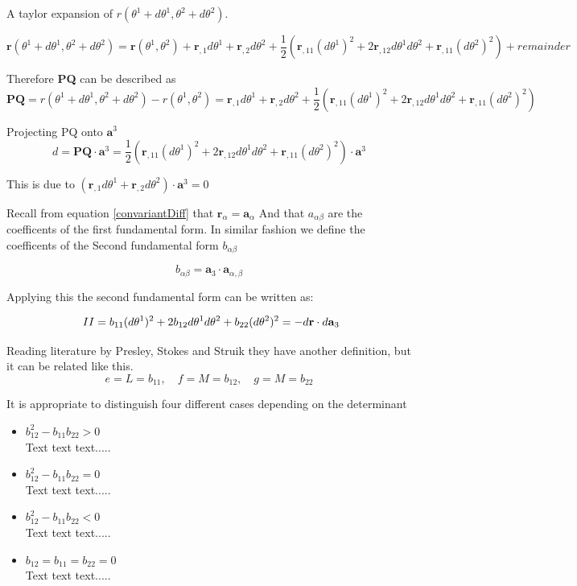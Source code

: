 A taylor expansion of $r(\theta^1 + d\theta^1, \theta^2 + d\theta^2)$.

$$
\textbf{r}(\theta^1 + d\theta^1, \theta^2 + d\theta^2)= \textbf{r}(\theta^1, \theta^2) + \textbf{r}_{,1} d\theta^1 + \textbf{r}_{,2} d\theta^2 + \frac{1}{2}(\textbf{r}_{,11}(d\theta^1)^2 + 2\textbf{r}_{,12}d\theta^1 d\theta^2 + \textbf{r}_{,11}(d\theta^2)^2) + remainder
$$

Therefore \textbf{PQ} can be described as
$$
\textbf{PQ} = r(\theta^1 + d\theta^1, \theta^2 + d\theta^2) - r(\theta^1, \theta^2) =  \textbf{r}_{,1} d\theta^1 + \textbf{r}_{,2} d\theta^2 + \frac{1}{2}(\textbf{r}_{,11}(d\theta^1)^2 + 2\textbf{r}_{,12}d\theta^1 d\theta^2 + \textbf{r}_{,11}(d\theta^2)^2) 
$$

Projecting PQ onto $\textbf{a}^3$ 
$$
d = \textbf{PQ}\cdot\textbf{a}^3 = \frac{1}{2}(\textbf{r}_{,11}(d\theta^1)^2 + 2\textbf{r}_{,12}d\theta^1 d\theta^2 + \textbf{r}_{,11}(d\theta^2)^2) \cdot \textbf{a}^3 
$$

This is due to $(\textbf{r}_{,1} d\theta^1 + \textbf{r}_{,2}d\theta^2)\cdot\textbf{a}^3 = 0$

Recall from equation \ref{convariantDiff} that $\textbf{r}_\alpha = \textbf{a}_\alpha$ And that $a_{\alpha\beta}$ are the coefficents of the first fundamental form. In similar fashion we define the coefficents of the Second fundamental form $b_{\alpha\beta}$ 

\begin{equation}
b_{\alpha\beta} = \textbf{a}_3 \cdot \textbf{a}_{\alpha,\beta} 
\end{equation}

Applying this the second fundamental form can be written as:

$$ ~\upperRomannumeral{2} = b_{11}(d\theta^1)^2 + 2b_{12}d\theta^1 d\theta^2 + b_{22}(d\theta^2)^2 = -d\textbf{r}\cdot d\textbf{a}_3$$

Reading literature by Presley, Stokes and Struik they have another definition, but it can be related like this.
$$ e = L = b_{11} ,\quad  f= M = b_{12},\quad
 g = M = b_{22}$$


It is appropriate to distinguish four different cases depending on the determinant

\begin{itemize}
\item $b_{12}^2 - b_{11}b_{22} > 0$ \\
Text text text.....
\item $b_{12}^2 - b_{11}b_{22} = 0$ \\
Text text text.....
\item $b_{12}^2 - b_{11}b_{22} < 0$ \\
Text text text.....
\item $b_{12} = b_{11} = b_{22} = 0$ \\
Text text text.....
\end{itemize}



